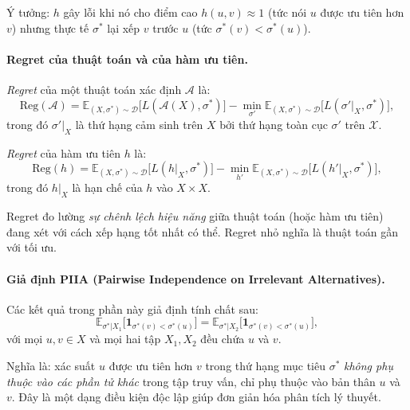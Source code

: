Ý tưởng: $h$ gây lỗi khi nó cho điểm cao $h(u,v) \approx 1$ (tức nói $u$ được ưu tiên hơn $v$) nhưng thực tế $\sigma^*$ lại xếp $v$ trước $u$ (tức $\sigma^*(v) < \sigma^*(u)$).

\paragraph{Regret của thuật toán và của hàm ưu tiên.}
\begin{definition}[Regret]
\emph{Regret} của một thuật toán xác định $\mathcal{A}$ là:
\begin{equation}
    \mathrm{Reg}(\mathcal{A}) = \mathbb{E}_{(X, \sigma^*) \sim \mathcal{D}}\bigl[L(\mathcal{A}(X), \sigma^*)\bigr] - \min_{\sigma'} \mathbb{E}_{(X, \sigma^*) \sim \mathcal{D}}\bigl[L(\sigma'|_X, \sigma^*)\bigr],
    \label{eq:regret_algo}
\end{equation}
trong đó $\sigma'|_X$ là thứ hạng cảm sinh trên $X$ bởi thứ hạng toàn cục $\sigma'$ trên $\mathcal{X}$.

\emph{Regret} của hàm ưu tiên $h$ là:
\begin{equation}
    \mathrm{Reg}(h) = \mathbb{E}_{(X, \sigma^*) \sim \mathcal{D}}\bigl[L(h|_X, \sigma^*)\bigr] - \min_{h'} \mathbb{E}_{(X, \sigma^*) \sim \mathcal{D}}\bigl[L(h'|_X, \sigma^*)\bigr],
    \label{eq:regret_h}
\end{equation}
trong đó $h|_X$ là hạn chế của $h$ vào $X \times X$.
\end{definition}

Regret đo lường \emph{sự chênh lệch hiệu năng} giữa thuật toán (hoặc hàm ưu tiên) đang xét với cách xếp hạng tốt nhất có thể. Regret nhỏ nghĩa là thuật toán gần với tối ưu.

\paragraph{Giả định PIIA (Pairwise Independence on Irrelevant Alternatives).}
Các kết quả trong phần này giả định tính chất sau:
\begin{equation}
    \mathbb{E}_{\sigma^* | X_1}\bigl[\mathbf{1}_{\sigma^*(v) < \sigma^*(u)}\bigr] = \mathbb{E}_{\sigma^* | X_2}\bigl[\mathbf{1}_{\sigma^*(v) < \sigma^*(u)}\bigr],
    \label{eq:piia}
\end{equation}
với mọi $u, v \in X$ và mọi hai tập $X_1, X_2$ đều chứa $u$ và $v$.

Nghĩa là: xác suất $u$ được ưu tiên hơn $v$ trong thứ hạng mục tiêu $\sigma^*$ \emph{không phụ thuộc vào các phần tử khác} trong tập truy vấn, chỉ phụ thuộc vào bản thân $u$ và $v$. Đây là một dạng điều kiện độc lập giúp đơn giản hóa phân tích lý thuyết.

